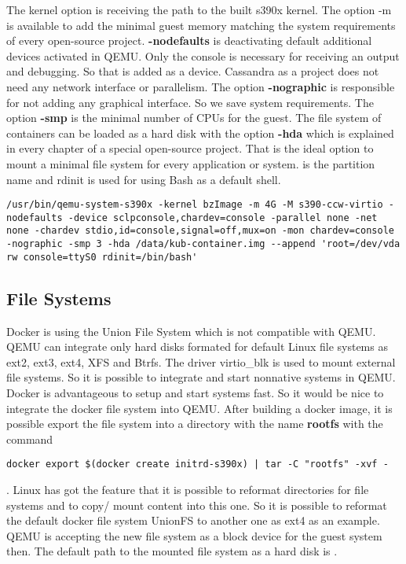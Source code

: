 The kernel option is receiving the path to the built s390x kernel. 
The option -m is available to add the minimal guest memory matching the system requirements of every open-source project. 
\textbf{-nodefaults} is deactivating default additional devices activated in QEMU. 
Only the console is necessary for receiving an output and debugging. 
So that is added as a device. Cassandra as a project does not need any network interface or parallelism. The 
option \textbf{-nographic} is responsible for not adding any graphical interface. 
So we save system requirements. The option \textbf{-smp} is the minimal number of CPUs for the guest. 
The file system of containers can be loaded as a hard disk with the option \textbf{-hda} which is explained in every chapter of a special open-source project. 
That is the ideal option to mount a minimal file system for every application or system. 
 is the partition name and rdinit is used for using Bash as a default shell. \\


\begin{lstlisting}[style=BashInputStyle]
/usr/bin/qemu-system-s390x -kernel bzImage -m 4G -M s390-ccw-virtio -nodefaults -device sclpconsole,chardev=console -parallel none -net none -chardev stdio,id=console,signal=off,mux=on -mon chardev=console -nographic -smp 3 -hda /data/kub-container.img --append 'root=/dev/vda rw console=ttyS0 rdinit=/bin/bash'
\end{lstlisting}

\subsection{File Systems}

Docker is using the Union File System which is not compatible with QEMU.
QEMU can integrate only hard disks formated for default Linux file systems as ext2, ext3, ext4, XFS and Btrfs. 
The driver virtio\_blk is used to mount external file systems. So it is possible to integrate and start nonnative systems in QEMU. 
Docker is advantageous to setup and start systems fast. 
So it would be nice to integrate the docker file system into QEMU. After building a docker image, it is possible export the file system into a directory with the name \textbf{rootfs} with the command 
\begin{lstlisting}[style=BashInputStyle]
docker export $(docker create initrd-s390x) | tar -C "rootfs" -xvf -
\end{lstlisting}
.
Linux has got the feature that it is possible to reformat directories for file systems and to copy/ mount content into this one. So it is possible to reformat the default docker file system UnionFS to another one as ext4 as an example. \\
QEMU is accepting the new file system as a block device for the guest system then. The default path to the mounted file system as a hard disk is \cite[~p.22]{White2020}.

